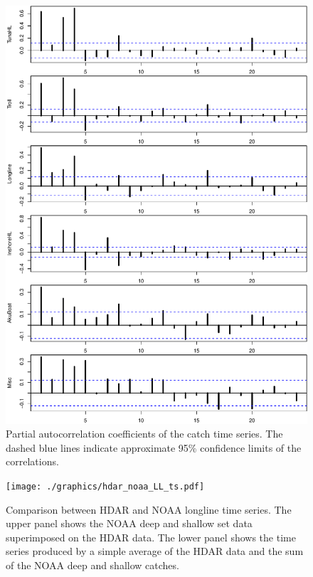 \documentclass[12pt,letterpaper]{article}
\begin{document}
\begin{figure}
\begin{center}
\includegraphics[height=0.8\textheight]{./graphics/partial_acf.pdf}
\caption{\label{fig:catchPACF}
Partial autocorrelation coefficients of the catch time series. The
dashed blue lines indicate approximate 95\% confidence limits of the
correlations.}
\end{center}
\end{figure}

\begin{figure}
\begin{center}
\texttt{[image: ./graphics/hdar\_noaa\_LL\_ts.pdf]}
\caption{\label{fig:hdarnoaaLLTS}
Comparison between HDAR and NOAA longline time series. The upper panel
shows the NOAA deep and shallow set data superimposed on the HDAR
data. The lower panel shows the time series produced by a simple
average of the HDAR data and the sum of the NOAA deep and shallow
catches.}
\end{center}
\end{figure}
\end{document}
